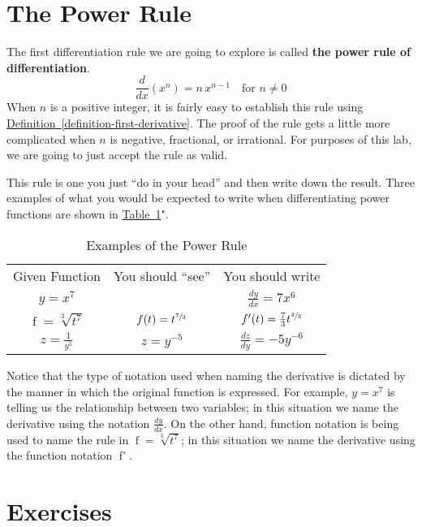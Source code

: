 \documentclass[12pt,]{book}
\newcommand{\terminology}[1]{\textbf{#1}}
\theoremstyle{plain}
\theoremstyle{definition}
\numberwithin{equation}{section}
\newcommand{\hrulemedium}{\noalign{\hrule height 0.07em}}
\newcommand{\hrulethick} {\noalign{\hrule height 0.11em}}
\newcommand{\fe}[2]{\mathop{{#1}{\left(#2\right)}}}
\newcommand{\fd}[1]{#1'}
\newcommand{\lz}[2]{\frac{d#1}{d#2}}
\newcommand{\lzoo}[2]{{\frac{d}{d#1}}{\left(#2\right)}}
\begin{document}
\section[The Power Rule]{The Power Rule}\label{section-power-rule}
The first differentiation rule we are going to explore is called \terminology{the power rule of differentiation}. \begin{equation}\lzoo{x}{x^n}=n\,x^{n-1}\quad\text{for }n\neq0\label{men-2}\end{equation} When \(n\) is a positive integer, it is fairly easy to establish this rule using \hyperref[definition-first-derivative]{Definition~\ref*{definition-first-derivative}}.  The proof of the rule gets a little more complicated when \(n\) is negative, fractional, or irrational.  For purposes of this lab, we are going to just accept the rule as valid.%
\par
This rule is one you just ``do in your head'' and then write down the result.  Three examples of what you would be expected to write when differentiating power functions are shown in \hyperref[table-power-rule]{Table~\ref*{table-power-rule}}".%
\begin{table}
\centering
\caption{Examples of the Power Rule\label{table-power-rule}}
\begin{tabular}{ccc}\hrulethick
Given Function&You should ``see''&You should write\\\hrulemedium
\(y=x^7\)&&\(\lz{y}{x}=7x^6\)\\
\(\fe{f}{t}=\sqrt[3]{t^7}\)&\(\fe{f}{t}=t^{\sfrac{7}{3}}\)&\(\fe{\fd{f}}{t}=\frac{7}{3}t^{\sfrac{4}{3}}\)\\
\(z=\frac{1}{y^5}\)&\(z=y^{-5}\)&\(\lz{z}{y}=-5y^{-6}\)
\end{tabular}
\end{table}
\par
Notice that the type of notation used when naming the derivative is dictated by the manner in which the original function is expressed.  For example, \(y=x^7\) is telling us the relationship between two variables; in this situation we name the derivative using the notation \(\lz{y}{x}\).  On the other hand, function notation is being used to name the rule in \(\fe{f}{t}=\sqrt[3]{t^7}\); in this situation we name the derivative using the function notation \(\fe{\fd{f}}{t}\).%
\typeout{************************************************}
\typeout{************************************************}
\section*{Exercises}\label{exercises-29}
\end{document}
